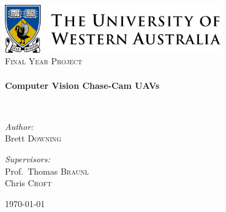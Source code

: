 
\begin{titlepage}
\begin{center}

\includegraphics[width=0.7\textwidth]{./logo.png}~\\[1cm]

\textsc{\Large Final Year Project}\\[0.5cm]

\HRule \\[0.4cm]
{ \huge \bfseries Computer Vision Chase-Cam UAVs \\[0.4cm] }

\HRule \\[1.5cm]

\noindent
\begin{minipage}[t]{0.4\textwidth}
\begin{flushleft} \large
\emph{Author:}\\
Brett \textsc{Downing}
\end{flushleft}
\end{minipage}%
\begin{minipage}[t]{0.4\textwidth}
\begin{flushright} \large
\emph{Supervisors:} \\
Prof.~Thomas \textsc{Braunl}\\
Chris \textsc{Croft}
\end{flushright}
\end{minipage}

\vfill

{\large \today}

\end{center}
\end{titlepage}